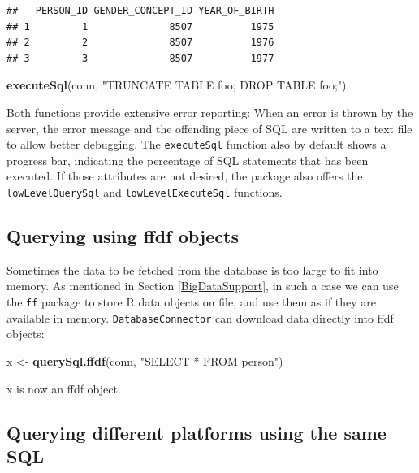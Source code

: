 \documentclass[11pt]{book}
\newenvironment{Shaded}{\begin{snugshade}}{\end{snugshade}}
\newcommand{\KeywordTok}[1]{\textcolor[rgb]{0.13,0.29,0.53}{\textbf{#1}}}
\newcommand{\NormalTok}[1]{#1}
\newcommand{\StringTok}[1]{\textcolor[rgb]{0.31,0.60,0.02}{#1}}
\theoremstyle{definition}
\theoremstyle{definition}
\theoremstyle{definition}
\theoremstyle{remark}
\begin{document}
\begin{verbatim}
##   PERSON_ID GENDER_CONCEPT_ID YEAR_OF_BIRTH
## 1         1              8507          1975
## 2         2              8507          1976
## 3         3              8507          1977
\end{verbatim}

\begin{Shaded}
\begin{Highlighting}[]
\KeywordTok{executeSql}\NormalTok{(conn, }\StringTok{"TRUNCATE TABLE foo; DROP TABLE foo;"}\NormalTok{)}
\end{Highlighting}
\end{Shaded}

Both functions provide extensive error reporting: When an error is thrown by the server, the error message and the offending piece of SQL are written to a text file to allow better debugging. The \texttt{executeSql} function also by default shows a progress bar, indicating the percentage of SQL statements that has been executed. If those attributes are not desired, the package also offers the \texttt{lowLevelQuerySql} and \texttt{lowLevelExecuteSql} functions.

\hypertarget{querying-using-ffdf-objects}{%
\subsection{Querying using ffdf objects}\label{querying-using-ffdf-objects}}

Sometimes the data to be fetched from the database is too large to fit into memory. As mentioned in Section \ref{BigDataSupport}, in such a case we can use the \texttt{ff} package to store R data objects on file, and use them as if they are available in memory. \texttt{DatabaseConnector} can download data directly into ffdf objects:

\begin{Shaded}
\begin{Highlighting}[]
\NormalTok{x <-}\StringTok{ }\KeywordTok{querySql.ffdf}\NormalTok{(conn, }\StringTok{"SELECT * FROM person"}\NormalTok{)}
\end{Highlighting}
\end{Shaded}

x is now an ffdf object.

\hypertarget{querying-different-platforms-using-the-same-sql}{%
\subsection{Querying different platforms using the same SQL}\label{querying-different-platforms-using-the-same-sql}}
\end{document}
